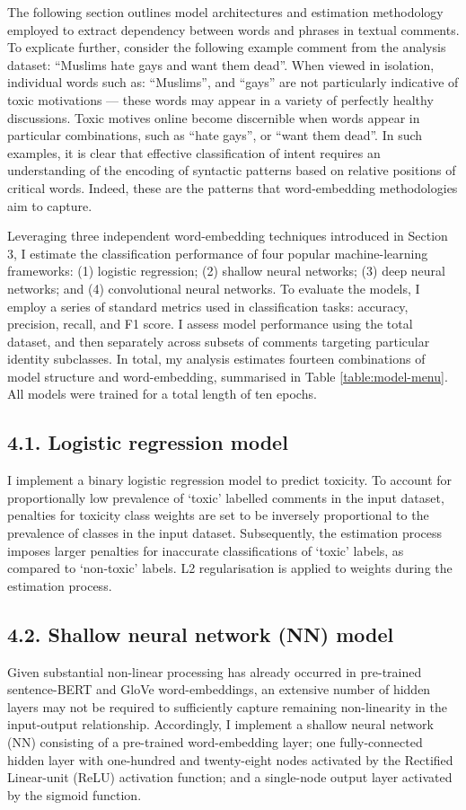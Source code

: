 
The following section outlines model architectures and estimation methodology employed to extract dependency between words and phrases in textual comments. To explicate further, consider the following example comment from the analysis dataset: ``Muslims hate gays and want them dead''. When viewed in isolation, individual words such as: ``Muslims'', and ``gays'' are not particularly indicative of toxic motivations --- these words may appear in a variety of perfectly healthy discussions. Toxic motives online become discernible when words appear in particular combinations, such as ``hate gays'', or ``want them dead''. In such examples, it is clear that effective classification of intent requires an understanding of the encoding of syntactic patterns based on relative positions of critical words. Indeed, these are the patterns that word-embedding methodologies aim to capture.

Leveraging three independent word-embedding techniques introduced in Section 3, I estimate the classification performance of four popular machine-learning frameworks: (1) logistic regression; (2) shallow neural networks; (3) deep neural networks; and (4) convolutional neural networks. To evaluate the models, I employ a series of standard metrics used in classification tasks: accuracy, precision, recall, and F1 score. I assess model performance using the total dataset, and then separately across subsets of comments targeting particular identity subclasses. In total, my analysis estimates fourteen combinations of model structure and word-embedding, summarised in Table \ref{table:model-menu}. All models were trained for a total length of ten epochs.

\subsection*{4.1. Logistic regression model}
I implement a binary logistic regression model to predict toxicity. To account for proportionally low prevalence of `toxic' labelled comments in the input dataset, penalties for toxicity class weights are set to be inversely proportional to the prevalence of classes in the input dataset. Subsequently, the estimation process imposes larger penalties for inaccurate classifications of `toxic' labels, as compared to `non-toxic' labels. L2 regularisation is applied to weights during the estimation process.

\subsection*{4.2. Shallow neural network (NN) model}
Given substantial non-linear processing has already occurred in pre-trained sentence-BERT and GloVe word-embeddings, an extensive number of hidden layers may not be required to sufficiently capture remaining non-linearity in the input-output relationship. Accordingly, I implement a shallow neural network (NN) consisting of a pre-trained word-embedding layer; one fully-connected hidden layer with one-hundred and twenty-eight nodes activated by the Rectified Linear-unit (ReLU) activation function; and a single-node output layer activated by the sigmoid function.

